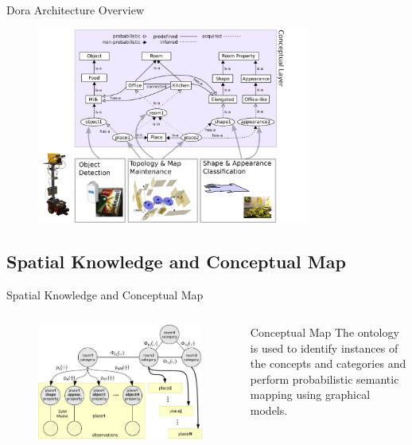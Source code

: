 \documentclass[compress]{beamer}
\begin{document}
\begin{frame}{Dora Architecture Overview}
  \begin{figure}
    \includegraphics[width=0.8\textwidth]{figures/processes.pdf}
  \end{figure}
\end{frame}

\subsection{Spatial Knowledge and Conceptual Map}
\begin{frame}{Spatial Knowledge and Conceptual Map}
  \begin{columns}[c]
    \begin{figure}
      \includegraphics[width=\textwidth]{figures/chaingraph.pdf}
    \end{figure}
    \begin{block}{Conceptual Map}
      The ontology is used to identify instances of the concepts and categories
      and perform probabilistic semantic mapping using graphical models.
    \end{block}
  \end{columns}
\end{frame}
\end{document}
